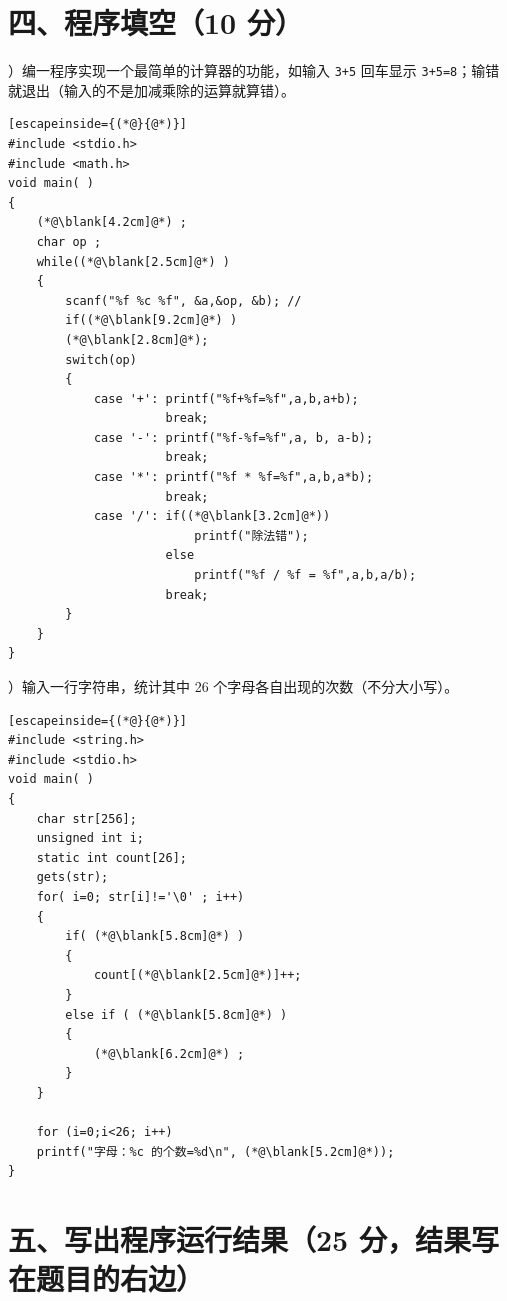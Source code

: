 \documentclass[UTF8,a4paper,10.5pt]{ctexart}
\newcommand{\blank}[1][4cm]{\underline{\hspace{#1}}}
\begin{document}
\section*{四、程序填空（10 分）}

）编一程序实现一个最简单的计算器的功能，如输入 \texttt{3+5} 回车显示 \texttt{3+5=8}；输错就退出（输入的不是加减乘除的运算就算错）。
\begin{lstlisting}[escapeinside={(*@}{@*)}]
#include <stdio.h>
#include <math.h>
void main( )
{
    (*@\blank[4.2cm]@*) ;
    char op ;
    while((*@\blank[2.5cm]@*) )
    {
        scanf("%f %c %f", &a,&op, &b); //
        if((*@\blank[9.2cm]@*) )
        (*@\blank[2.8cm]@*);
        switch(op)
        {
            case '+': printf("%f+%f=%f",a,b,a+b);
                      break;
            case '-': printf("%f-%f=%f",a, b, a-b);
                      break;
            case '*': printf("%f * %f=%f",a,b,a*b);
                      break;
            case '/': if((*@\blank[3.2cm]@*))
                          printf("除法错");
                      else
                          printf("%f / %f = %f",a,b,a/b);
                      break;
        }
    }
}
\end{lstlisting}

\medskip
{}）输入一行字符串，统计其中 26 个字母各自出现的次数（不分大小写）。
\begin{lstlisting}[escapeinside={(*@}{@*)}]
#include <string.h>
#include <stdio.h>
void main( )
{
    char str[256];
    unsigned int i;
    static int count[26];
    gets(str);
    for( i=0; str[i]!='\0' ; i++)
    {
        if( (*@\blank[5.8cm]@*) )
        {
            count[(*@\blank[2.5cm]@*)]++;
        }
        else if ( (*@\blank[5.8cm]@*) )
        {
            (*@\blank[6.2cm]@*) ;
        }
    }

    for (i=0;i<26; i++)
    printf("字母：%c 的个数=%d\n", (*@\blank[5.2cm]@*));
}
\end{lstlisting}

\section*{五、写出程序运行结果（25 分，结果写在题目的右边）}
\end{document}
